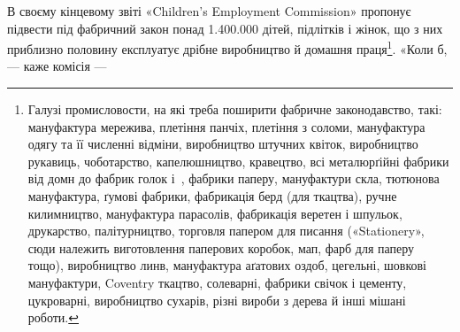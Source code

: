 В своєму кінцевому звіті «Children’s Employment Commission» пропонує підвести
під фабричний закон понад \num{1.400.000} дітей, підлітків і жінок, що з них
приблизно половину експлуатує дрібне виробництво
й домашня праця\footnote{
Галузі промисловости, на які треба поширити фабричне законодавство, такі:
мануфактура мережива, плетіння панчіх, плетіння з соломи, мануфактура одягу
та її численні відміни, виробництво штучних квіток, виробництво рукавиць,
чоботарство, капелюшництво, кравецтво, всі металюрґійні
фабрики від домн до фабрик голок і~, фабрики паперу, мануфактури скла,
тютюнова мануфактура, ґумові фабрики, фабрикація берд (для ткацтва), ручне
килимництво, мануфактура парасолів, фабрикація
веретен і шпульок, друкарство, палітурництво, торговля папером для писання
(«Stationery», сюди належить виготовлення паперових коробок, мап, фарб для
паперу тощо), виробництво линв, мануфактура
аґатових оздоб, цегельні, шовкові мануфактури, Coventry ткацтво, солеварні,
фабрики свічок і цементу, цукроварні, виробництво сухарів, різні вироби з
дерева й інші мішані роботи.
}. «Коли б, — каже комісія —
\parbreak{}  %
